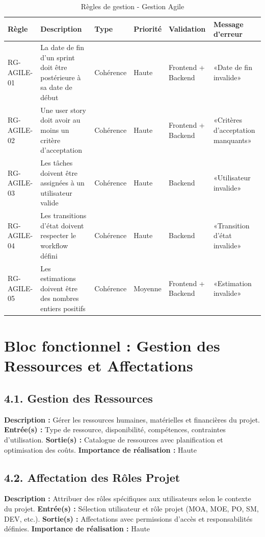 \begin{table}[H]
\centering
\footnotesize
\begin{tabular}{|p{1.5cm}|p{3.5cm}|p{1.5cm}|p{1.5cm}|p{2cm}|p{2.5cm}|}
\hline
\textbf{Règle} & \textbf{Description} & \textbf{Type} & \textbf{Priorité} & \textbf{Validation} & \textbf{Message d'erreur} \\
\hline
RG-AGILE-01 & La date de fin d'un sprint doit être postérieure à sa date de début & Cohérence & Haute & Frontend + Backend & «Date de fin invalide» \\
\hline
RG-AGILE-02 & Une user story doit avoir au moins un critère d'acceptation & Cohérence & Haute & Frontend + Backend & «Critères d'acceptation manquants» \\
\hline
RG-AGILE-03 & Les tâches doivent être assignées à un utilisateur valide & Cohérence & Haute & Backend & «Utilisateur invalide» \\
\hline
RG-AGILE-04 & Les transitions d'état doivent respecter le workflow défini & Cohérence & Haute & Backend & «Transition d'état invalide» \\
\hline
RG-AGILE-05 & Les estimations doivent être des nombres entiers positifs & Cohérence & Moyenne & Frontend + Backend & «Estimation invalide» \\
\hline
\end{tabular}
\caption{Règles de gestion - Gestion Agile}
\label{tab:rg_agile}
\end{table}

\section{Bloc fonctionnel : Gestion des Ressources et Affectations}

\subsection{4.1. Gestion des Ressources}
\textbf{Description :} Gérer les ressources humaines, matérielles et financières du projet.
\textbf{Entrée(s) :} Type de ressource, disponibilité, compétences, contraintes d'utilisation.
\textbf{Sortie(s) :} Catalogue de ressources avec planification et optimisation des coûts.
\textbf{Importance de réalisation :} Haute

\subsection{4.2. Affectation des Rôles Projet}
\textbf{Description :} Attribuer des rôles spécifiques aux utilisateurs selon le contexte du projet.
\textbf{Entrée(s) :} Sélection utilisateur et rôle projet (MOA, MOE, PO, SM, DEV, etc.).
\textbf{Sortie(s) :} Affectations avec permissions d'accès et responsabilités définies.
\textbf{Importance de réalisation :} Haute

